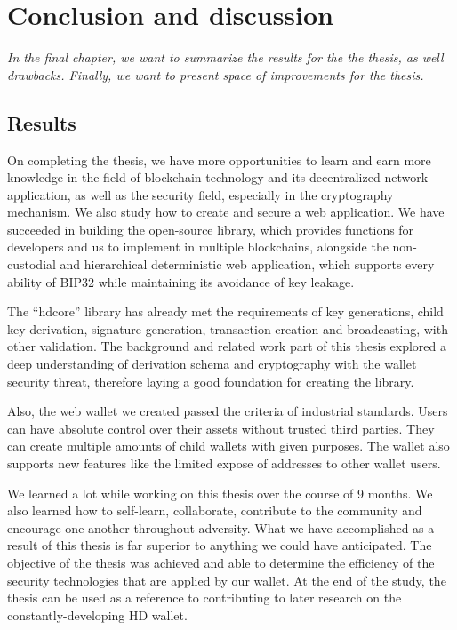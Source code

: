 \chapter{Conclusion and discussion} \label{chap:conclusion}
\textit{In the final chapter, we want to summarize the results for the the thesis, as well drawbacks.
Finally, we want to present space of improvements for the thesis.}

\minitoc

\section{Results}

On completing the thesis, we have more opportunities to learn and earn more knowledge in the field of blockchain technology and its decentralized network application, as well as the security field, especially in the cryptography mechanism. We also study how to create and secure a web application. We have succeeded in building the open-source library, which provides functions for developers and us to implement in multiple blockchains, alongside the non-custodial and hierarchical deterministic web application, which supports every ability of BIP32 while maintaining its avoidance of key leakage.


The “hdcore” library has already met the requirements of key generations, child key derivation, signature generation, transaction creation and broadcasting, with other validation. The background and related work part of this thesis explored a deep understanding of derivation schema and cryptography with the wallet security threat, therefore laying a good foundation for creating the library.


Also, the web wallet we created passed the criteria of industrial standards. Users can have absolute control over their assets without trusted third parties. They can create multiple amounts of child wallets with given purposes. The wallet also supports new features like the limited expose of addresses to other wallet users.


We learned a lot while working on this thesis over the course of 9 months. We also learned how to self-learn, collaborate, contribute to the community and encourage one another throughout adversity. What we have accomplished as a result of this thesis is far superior to anything we could have anticipated. The objective of the thesis was achieved and able to determine the efficiency of the security technologies that are applied by our wallet. At the end of the study, the thesis can be used as a reference to contributing to later research on the constantly-developing HD wallet.

